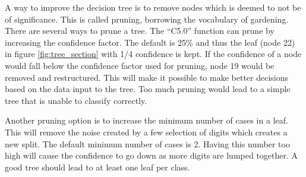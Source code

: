 A way to improve the decision tree is to remove nodes which is deemed to not be of significance.
This is called pruning, borrowing the vocabulary of gardening.
There are several ways to prune a tree.
The ``C5.0'' function can prune by increasing the confidence factor. 
The default is 25\% and thus the leaf (node 22) in figure \ref{fig:tree_section} with 1/4 confidence is kept.
If the confidence of a node would fall below the confidence factor used for pruning, node 19 would be removed and restructured.
This will make it possible to make better decisions based on the data input to the tree.
Too much pruning would lead to a simple tree that is unable to classify correctly.

Another pruning option is to increase the minimum number of cases in a leaf. 
This will remove the noise created by a few selection of digits which creates a new split.
The default minimum number of cases is 2.
Having this number too high will cause the confidence to go down as more digits are lumped together. 
A good tree should lead to at least one leaf per class.